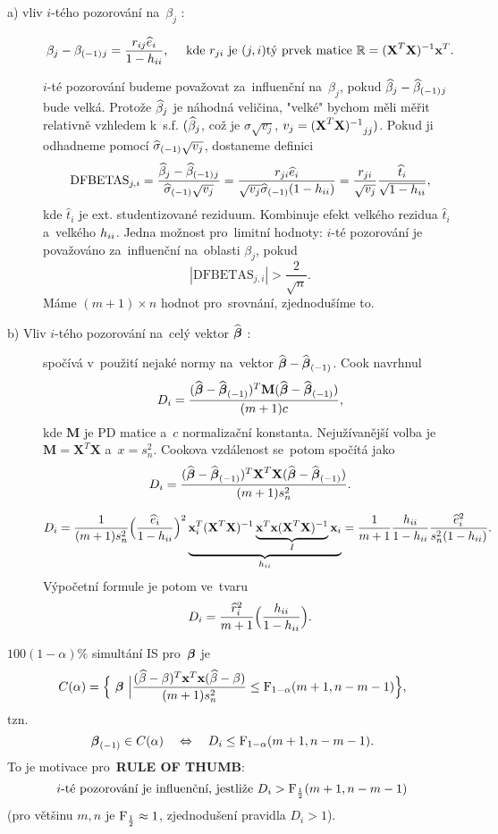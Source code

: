 \begin{description}
	\item[a) vliv $i$-tého pozorování na~$\beta_j$ :]
	 $$ \beta_j-{\beta_{(-1)}}{}_j = \frac{r_{ij}\widehat{e}_i}{1-h_{ii}},\quad\text{ kde }r_{ji}\text{ je }(j,i)\text{tý prvek matice }\mathbb{R} = {(\textbf{X}^T\textbf{X})^{-1}}\textbf{x}^T. $$
	
	 $i$-té pozorování budeme považovat za~influenční na~$\beta_j$, pokud $\widehat{\beta}_j-{\widehat{\beta}_{(-1)}}{}_j$ bude velká. Protože $\widehat{\beta} _j$ je náhodná veličina, "velké" bychom měli měřit relativně vzhledem k~s.f. $(\widehat{\beta} _j$, což je $\sigma\sqrt{v_j}$, $v_j = {(\textbf{X}^T\textbf{X})^{-1}} _{jj})$. Pokud ji odhadneme pomocí ${\widehat{{\sigma}}_{(-1)}}\sqrt{v_j}$, dostaneme definici
	 $$ \mathrm{DFBETAS}_{j,i} = \frac{\widehat{\beta}_j-{\widehat{\beta}_{(-1)}}{}_j}{{\widehat{{\sigma}}_{(-1)}}\sqrt{v_j}} = \frac{r_{ji}\widehat{e}_i}{\sqrt{v_j}{\widehat{{\sigma}}_{(-1)}}(1-h_{ii})} = \frac{r_{ji}}{\sqrt{v_j}}\frac{\widehat{t}_i}{\sqrt{1-h_{ii}}}, $$
	kde $\widehat{t}_i$ je ext. studentizované reziduum. Kombinuje efekt velkého rezidua $\widehat{t}_i$ a~velkého $h_{ii}$. Jedna možnost pro~limitní hodnoty: $i$-té pozorování je považováno za~influenční na~oblasti $\beta_j$, pokud
	 $$ |\mathrm{DFBETAS}_{j,i}|>\frac{2}{\sqrt{n}}. $$ Máme $(m+1)\times n$ hodnot pro~srovnání, zjednodušíme to.
	\item[b) Vliv $i$-tého pozorování na~celý vektor $\widehat{\boldsymbol{\beta}}$ :]
	spočívá v~použití nejaké normy na~vektor $\widehat{\boldsymbol{\beta}}-{\widehat{\boldsymbol{\beta}}_{(-1)}}$. Cook navrhnul
	 $$ D_i = \frac{(\widehat{\boldsymbol{\beta}}-{\widehat{\boldsymbol{\beta}}_{(-1)}})^T\textbf{M}(\widehat{\boldsymbol{\beta}}-{\widehat{\boldsymbol{\beta}}_{(-1)}})}{(m+1)c}, $$
	kde $\textbf{M}$ je PD matice a~$c$ normalizační konstanta. Nejužívanější volba je $\textbf{M} = \textbf{X}^T\textbf{X}$ a~$x = s_n^2$. Cookova vzdálenost se~potom spočítá jako
	 $$ D_i = \frac{(\widehat{\boldsymbol{\beta}}-{\widehat{\boldsymbol{\beta}}_{(-1)}})^T\textbf{X}^T\textbf{X}(\widehat{\boldsymbol{\beta}}-{\widehat{\boldsymbol{\beta}}_{(-1)}})}{(m+1)s_n^2}. $$
	
	 $$ D_i = \frac{1}{(m+1)s_n^2}\Big(\frac{\widehat{e}_i}{1-h_{ii}}\Big)^2 \underbrace{\textbf{x}_i^T{(\textbf{X}^T\textbf{X})^{-1}} \underbrace{\textbf{x}^T\textbf{x}{(\textbf{X}^T\textbf{X})^{-1}}}_I\textbf{x}_i}_{h_{ii}} = \frac{1}{m+1}\frac{h_{ii}}{1-h_{ii}}\frac{\widehat{e}_i^2}{s_n^2(1-h_{ii})}. $$
	Výpočetní formule je potom ve~tvaru
	 $$ D_i = \frac{\widehat{r}_i^2}{m+1}\Big(\frac{h_{ii}}{1-h_{ii}}\Big). $$
\end{description}

\begin{remark}
	 $100(1-\alpha)\%$ simultání IS pro~$\boldsymbol{\beta}$ je $$ C(\alpha) = \Big\{ ~\boldsymbol{\beta}~\Big|\frac{(\widehat{\beta}-\beta)^T\textbf{x}^T\textbf{x}(\widehat{\beta}-\beta)}{(m+1)s_n^2}\leq \mathrm{F}_{1-\alpha}(m+1,n-m-1) \Big\}, $$
	tzn. $$ {\boldsymbol{\beta}_{(-1)}}\in C(\alpha)\quad \Leftrightarrow\quad D_i\leq \mathrm{F}_{1-\alpha}(m+1,n-m-1). $$
	To je motivace pro~\textbf{RULE OF THUMB}: $$ \text{ $i$-té pozorování je influenční, jestliže $D_i>\mathrm{F}_{\frac{1}{2}}(m+1,n-m-1)$ } $$ (pro většinu $m,n$ je $\mathrm{F}_{\frac{1}{2}}\approx1$, zjednodušení pravidla $D_i>1$).
\end{remark}


